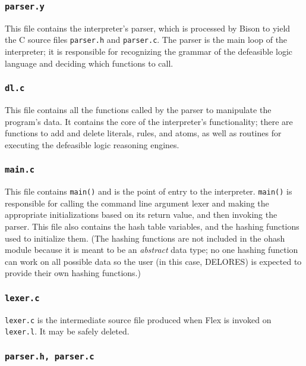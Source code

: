 \documentclass[a4paper,10pt,twocolumn]{article}
\begin{document}
\subsubsection{\texttt{parser.y}}
  
This file contains the interpreter's parser, which is processed by
Bison to yield the C source files \texttt{parser.h} and
\texttt{parser.c}. The parser is the main loop of the interpreter; it
is responsible for recognizing the grammar of the defeasible logic
language and deciding which functions to call.
  
\subsubsection{\texttt{dl.c}}
      
This file contains all the functions called by the parser to
manipulate the program's data. It contains the core of the
interpreter's functionality; there are functions to add and delete
literals, rules, and atoms, as well as routines for executing the
defeasible logic reasoning engines.
  
\subsubsection{\texttt{main.c}}
  
This file contains \texttt{main()} and is the point of entry to the
interpreter. \texttt{main()} is responsible for calling the command
line argument lexer and making the appropriate initializations based
on its return value, and then invoking the parser. This file also
contains the hash table variables, and the hashing functions used to
initialize them. (The hashing functions are not included in the ohash
module because it is meant to be an \emph{abstract} data type; no one
hashing function can work on all possible data so the user (in this
case, DELORES) is expected to provide their own hashing functions.)
  
\subsubsection{\texttt{lexer.c}}
  
\texttt{lexer.c} is the intermediate source file produced when Flex is
invoked on \texttt{lexer.l}. It may be safely deleted.
  
\subsubsection{\texttt{parser.h, parser.c}}
  
\end{document}
